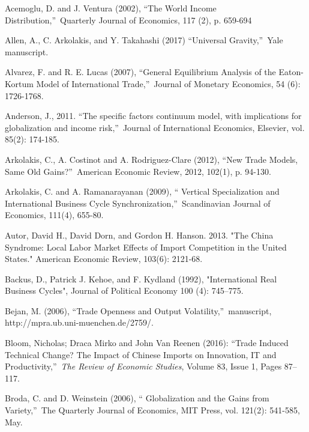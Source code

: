 \documentclass[12pt]{article}
\begin{document}
\begin{thebibliography}{99}
\bibitem{} Acemoglu, D. and J. Ventura (2002), \textquotedblleft The World
Income Distribution,\textquotedblright\ Quarterly Journal of Economics, 117
(2), p. 659-694

\bibitem{} Allen, A., C. Arkolakis, and Y. Takahashi (2017)
\textquotedblleft Universal Gravity,\textquotedblright\ Yale manuscript.

\bibitem{} Alvarez, F. and R. E. Lucas (2007), \textquotedblleft General
Equilibrium Analysis of the Eaton-Kortum Model of International
Trade,\textquotedblright\ Journal of Monetary Economics, 54 (6): 1726-1768.

\bibitem{} Anderson, J., 2011. \textquotedblleft The specific factors
continuum model, with implications for globalization and income
risk,\textquotedblright\ Journal of International Economics, Elsevier, vol.
85(2): 174-185.

\bibitem{} Arkolakis, C., A. Costinot and A. Rodriguez-Clare (2012),
\textquotedblleft New Trade Models, Same Old Gains?\textquotedblright\
American Economic Review, 2012, 102(1), p. 94-130.

\bibitem{} Arkolakis, C. and A. Ramanarayanan (2009), \textquotedblleft
Vertical Specialization and International Business Cycle
Synchronization,\textquotedblright\ Scandinavian Journal of Economics,
111(4), 655-80.

\bibitem{} Autor, David H., David Dorn, and Gordon H. Hanson. 2013. "The
China Syndrome: Local Labor Market Effects of Import Competition in the
United States." American Economic Review, 103(6): 2121-68.

\bibitem{} Backus, D., Patrick J. Kehoe, and F. Kydland (1992),
"International Real Business Cycles", Journal of Political Economy 100 (4):
745--775.

\bibitem{} Bejan, M. (2006), \textquotedblleft Trade Openness and Output
Volatility,\textquotedblright\ manuscript,
http://mpra.ub.uni-muenchen.de/2759/.

\bibitem{} Bloom, Nicholas; Draca Mirko and John Van Reenen (2016):
\textquotedblleft Trade Induced Technical Change? The Impact of Chinese
Imports on Innovation, IT and Productivity,\textquotedblright\ \textit{The
Review of Economic Studies}, Volume 83, Issue 1, Pages 87--117.

\bibitem{} Broda, C. and D. Weinstein (2006), \textquotedblleft
Globalization and the Gains from Variety,\textquotedblright\ The Quarterly
Journal of Economics, MIT Press, vol. 121(2): 541-585, May.


\end{thebibliography}
\end{document}

